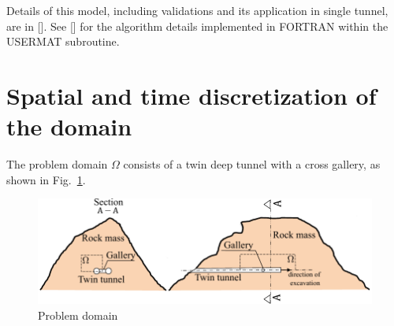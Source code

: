 \documentclass[a4paper,fleqn]{cas-sc}
\begin{document}
Details of this model, including validations and its application in single tunnel, are in []. See [] for the algorithm details implemented in FORTRAN within the USERMAT subroutine.

\section{Spatial and time discretization of the domain}\label{}

The problem domain $\Omega$ consists of a twin deep tunnel with a cross gallery, as shown in Fig.~\ref{domain}.
\begin{figure}[h!]
	\centering
	\includegraphics[scale=1]{Domain.pdf}
	\caption{Problem domain}
	\label{domain}
\end{figure}
\FloatBarrier
\end{document}
